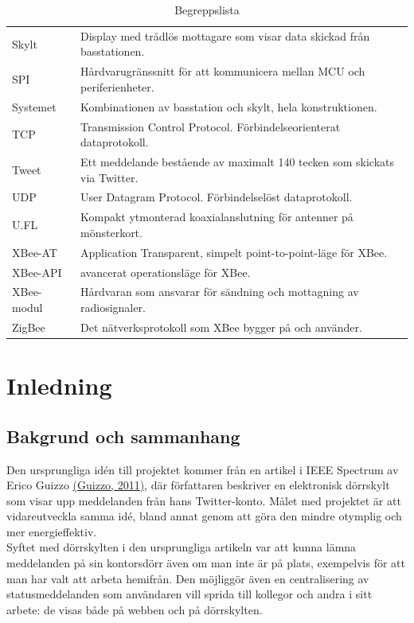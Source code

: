 \documentclass[a4paper,11pt]{article}
\begin{document}
\begin{table}[h!]
\begin{tabular}{|l|l|}
Skylt & Display med trådlös mottagare som visar data skickad från basstationen.\\
SPI & Hårdvarugränssnitt för att kommunicera mellan MCU och periferienheter.\\
Systemet & Kombinationen av basstation och skylt, hela konstruktionen.\\
TCP & Transmission Control Protocol. Förbindelseorienterat dataprotokoll.\\
Tweet & Ett meddelande bestående av maximalt 140 tecken som skickats via Twitter.\\
UDP & User Datagram Protocol. Förbindelselöst dataprotokoll.\\
U.FL & Kompakt ytmonterad koaxialanslutning för antenner på mönsterkort.\\
XBee-AT & Application Transparent, simpelt point-to-point-läge för XBee.\\
XBee-API & avancerat operationsläge för XBee.\\
XBee-modul & Hårdvaran som ansvarar för sändning och mottagning av radiosignaler.\\
ZigBee & Det nätverksprotokoll som XBee bygger på och använder.\\
	\end{tabular}
\caption{Begreppslista}
\label{tab:begreppstable}
\end{table}

\thispagestyle{empty}
\pagebreak

\thispagestyle{empty}
\tableofcontents
\thispagestyle{empty}
\pagebreak

\setcounter{page}{1}
\section{Inledning}

\subsection{Bakgrund och sammanhang}
Den ursprungliga idén till projektet kommer från en artikel i IEEE Spectrum av Erico Guizzo \hyperref[spectrum]{(Guizzo, 2011)}, där författaren beskriver en elektronisk dörrskylt som visar upp meddelanden från hans Twitter-konto. Målet med projektet är att vidareutveckla samma idé, bland annat genom att göra den mindre otymplig och mer energieffektiv. \\

Syftet med dörrskylten i den ursprungliga artikeln var att kunna lämna meddelanden på sin kontorsdörr även om man inte är på plats, exempelvis för att man har valt att arbeta hemifrån. Den möjliggör även en centralisering av statusmeddelanden som användaren vill sprida till kollegor och andra i sitt arbete: de visas både på webben och på dörrskylten.\\
\end{document}
